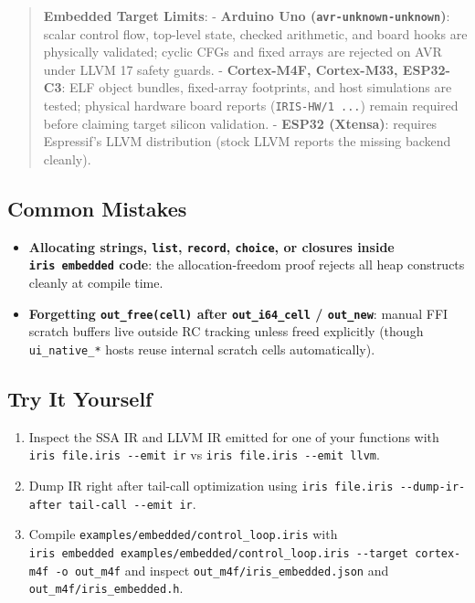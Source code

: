 \documentclass[
  english,
  oneside]{book}
\providecommand{\tightlist}{%
  \setlength{\itemsep}{0pt}\setlength{\parskip}{0pt}}
\begin{document}
\begin{quote}
\textbf{Embedded Target Limits}: - \textbf{Arduino Uno
(\texttt{avr-unknown-unknown})}: scalar control flow, top-level state,
checked arithmetic, and board hooks are physically validated; cyclic
CFGs and fixed arrays are rejected on AVR under LLVM 17 safety guards. -
\textbf{Cortex-M4F, Cortex-M33, ESP32-C3}: ELF object bundles,
fixed-array footprints, and host simulations are tested; physical
hardware board reports (\texttt{IRIS-HW/1\ ...}) remain required before
claiming target silicon validation. - \textbf{ESP32 (Xtensa)}: requires
Espressif's LLVM distribution (stock LLVM reports the missing backend
cleanly).
\end{quote}

\subsection{Common Mistakes}\label{common-mistakes-11}

\begin{itemize}
\tightlist
\item
  \textbf{Allocating strings, \texttt{list}, \texttt{record},
  \texttt{choice}, or closures inside \texttt{iris\ embedded} code}: the
  allocation-freedom proof rejects all heap constructs cleanly at
  compile time.
\item
  \textbf{Forgetting \texttt{out\_free(cell)} after
  \texttt{out\_i64\_cell} / \texttt{out\_new}}: manual FFI scratch
  buffers live outside RC tracking unless freed explicitly (though
  \texttt{ui\_native\_*} hosts reuse internal scratch cells
  automatically).
\end{itemize}

\subsection{Try It Yourself}\label{try-it-yourself-11}

\begin{enumerate}
\def\labelenumi{\arabic{enumi}.}
\tightlist
\item
  Inspect the SSA IR and LLVM IR emitted for one of your functions with
  \texttt{iris\ file.iris\ -\/-emit\ ir} vs
  \texttt{iris\ file.iris\ -\/-emit\ llvm}.
\item
  Dump IR right after tail-call optimization using
  \texttt{iris\ file.iris\ -\/-dump-ir-after\ tail-call\ -\/-emit\ ir}.
\item
  Compile \texttt{examples/embedded/control\_loop.iris} with
  \texttt{iris\ embedded\ examples/embedded/control\_loop.iris\ -\/-target\ cortex-m4f\ -o\ out\_m4f}
  and inspect \texttt{out\_m4f/iris\_embedded.json} and
  \texttt{out\_m4f/iris\_embedded.h}.
\end{enumerate}
\end{document}
